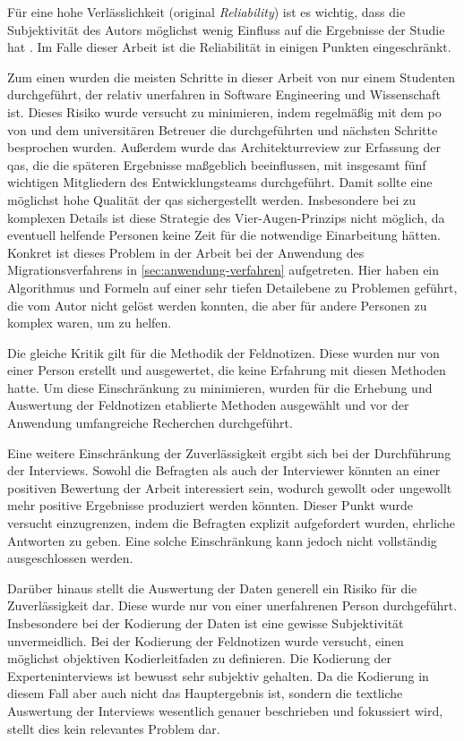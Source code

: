 Für eine hohe Verlässlichkeit (original \emph{Reliability}) ist es wichtig, dass die Subjektivität des Autors möglichst wenig Einfluss auf die Ergebnisse der Studie hat \cite{Runeson2009}.
Im Falle dieser Arbeit ist die Reliabilität in einigen Punkten eingeschränkt.

Zum einen wurden die meisten Schritte in dieser Arbeit von nur einem Studenten durchgeführt, der relativ unerfahren in Software Engineering und Wissenschaft ist.
Dieses Risiko wurde versucht zu minimieren, indem regelmäßig mit dem \gls{po} von \jf und dem universitären Betreuer die durchgeführten und nächsten Schritte besprochen wurden.
Außerdem wurde das Architekturreview zur Erfassung der \glspl{qa}, die die späteren Ergebnisse maßgeblich beeinflussen, mit insgesamt fünf wichtigen Mitgliedern des Entwicklungsteams durchgeführt.
Damit sollte eine möglichst hohe Qualität der \glspl{qa} sichergestellt werden.
Insbesondere bei zu komplexen Details ist diese Strategie des Vier-Augen-Prinzips nicht möglich, da eventuell helfende Personen keine Zeit für die notwendige Einarbeitung hätten. 
Konkret ist dieses Problem in der Arbeit bei der Anwendung des Migrationsverfahrens in \cref{sec:anwendung-verfahren} aufgetreten.
Hier haben ein Algorithmus und Formeln auf einer sehr tiefen Detailebene zu Problemen geführt, die vom Autor nicht gelöst werden konnten, die aber für andere Personen zu komplex waren, um zu helfen.

Die gleiche Kritik gilt für die Methodik der Feldnotizen.
Diese wurden nur von einer Person erstellt und ausgewertet, die keine Erfahrung mit diesen Methoden hatte.
Um diese Einschränkung zu minimieren, wurden für die Erhebung und Auswertung der Feldnotizen etablierte Methoden ausgewählt und vor der Anwendung umfangreiche Recherchen durchgeführt.

Eine weitere Einschränkung der Zuverlässigkeit ergibt sich bei der Durchführung der Interviews. 
Sowohl die Befragten als auch der Interviewer könnten an einer positiven Bewertung der Arbeit interessiert sein, wodurch gewollt oder ungewollt mehr positive Ergebnisse produziert werden könnten.
Dieser Punkt wurde versucht einzugrenzen, indem die Befragten explizit aufgefordert wurden, ehrliche Antworten zu geben. 
Eine solche Einschränkung kann jedoch nicht vollständig ausgeschlossen werden.

Darüber hinaus stellt die Auswertung der Daten generell ein Risiko für die Zuverlässigkeit dar. 
Diese wurde nur von einer unerfahrenen Person durchgeführt. 
Insbesondere bei der Kodierung der Daten ist eine gewisse Subjektivität unvermeidlich.
Bei der Kodierung der Feldnotizen wurde versucht, einen möglichst objektiven Kodierleitfaden zu definieren.
Die Kodierung der Experteninterviews ist bewusst sehr subjektiv gehalten.
Da die Kodierung in diesem Fall aber auch nicht das Hauptergebnis ist, sondern die textliche Auswertung der Interviews wesentlich genauer beschrieben und fokussiert wird, stellt dies kein relevantes Problem dar.

